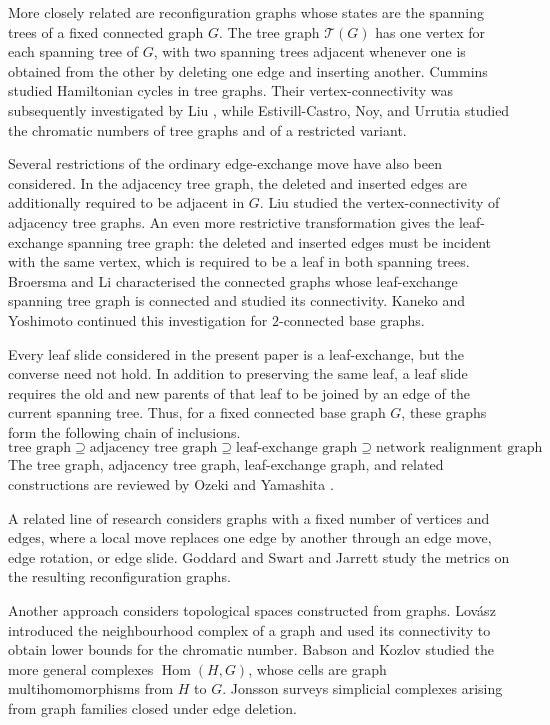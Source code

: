 \documentclass[reqno,dvipsnames]{amsart}
\theoremstyle{plain}
\numberwithin{equation}{section}
\theoremstyle{definition}
\begin{document}
More closely related are reconfiguration graphs whose states are the spanning trees of a fixed connected graph $G$. The tree graph $\mathcal{T}(G)$ has one vertex for each spanning tree of $G$, with two spanning trees adjacent whenever one is obtained from the other by deleting one edge and inserting another. Cummins \cite{Cummins66} studied Hamiltonian cycles in tree graphs. Their vertex-connectivity was subsequently investigated by Liu \cite{Liu88}, while Estivill-Castro, Noy, and Urrutia \cite{Estivill00} studied the chromatic numbers of tree graphs and of a restricted variant.

Several restrictions of the ordinary edge-exchange move have also been considered. In the adjacency tree graph, the deleted and inserted edges are additionally required to be adjacent in $G$. Liu \cite{Liu87Adjacent} studied the vertex-connectivity of adjacency tree graphs. An even more restrictive transformation gives the leaf-exchange spanning tree graph: the deleted and inserted edges must be incident with the same vertex, which is required to be a leaf in both spanning trees. Broersma and Li \cite{Broersma96} characterised the connected graphs whose leaf-exchange spanning tree graph is connected and studied its connectivity. Kaneko and Yoshimoto \cite{Kaneko99} continued this investigation for $2$-connected base graphs.

Every leaf slide considered in the present paper is a leaf-exchange, but the converse need not hold. In addition to preserving the same leaf, a leaf slide requires the old and new parents of that leaf to be joined by an edge of the current spanning tree. Thus, for a fixed connected base graph $G$, these graphs form the following chain of inclusions.
\[
	\text{tree graph}\supseteq\text{adjacency tree graph} \supseteq \text{leaf-exchange graph} \supseteq \text{network realignment graph}
\] 
The tree graph, adjacency tree graph, leaf-exchange graph, and related constructions are reviewed by Ozeki and Yamashita \cite{OzekiYamashita11}.

A related line of research considers graphs with a fixed number of vertices and edges, where a local move replaces one edge by another through an edge move, edge rotation, or edge slide. Goddard and Swart \cite{Goddard96} and Jarrett \cite{Jarrett97} study the metrics on the resulting reconfiguration graphs.

Another approach considers topological spaces constructed from graphs. Lovász \cite{Lovasz78} introduced the neighbourhood complex of a graph and used its connectivity to obtain lower bounds for the chromatic number. Babson and Kozlov \cite{Babson07} studied the more general complexes $\operatorname{Hom}(H,G)$, whose cells are graph multihomomorphisms from $H$ to $G$. Jonsson \cite{Jonsson} surveys simplicial complexes arising from graph families closed under edge deletion.
\end{document}
